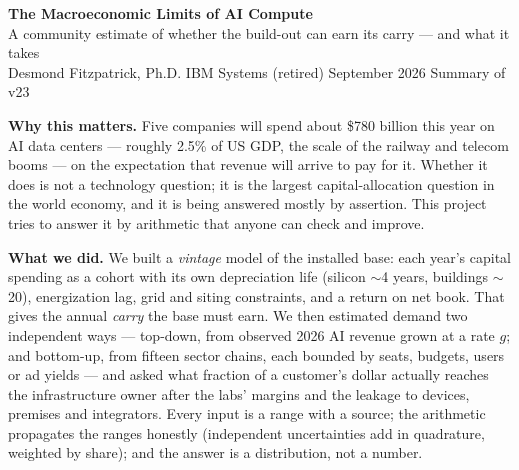 \documentclass[11pt,letterpaper]{article}
\begin{document}
\begin{center}{\Large\textbf{The Macroeconomic Limits of AI Compute}}\\[2pt]
{\normalsize A community estimate of whether the build-out can earn its carry --- and what it takes}\\[2pt]
{\small Desmond Fitzpatrick, Ph.D. \quad IBM Systems (retired) \quad September 2026 \quad Summary of v23}\end{center}
\vspace{4pt}
\noindent\textbf{Why this matters.} Five companies will spend about \$780 billion this year on AI data centers --- roughly 2.5\% of US GDP, the scale of the railway and telecom booms --- on the expectation that revenue will arrive to pay for it. Whether it does is not a technology question; it is the largest capital-allocation question in the world economy, and it is being answered mostly by assertion. This project tries to answer it by arithmetic that anyone can check and improve.

\noindent\textbf{What we did.} We built a \emph{vintage} model of the installed base: each year's capital spending as a cohort with its own depreciation life (silicon $\sim$4 years, buildings $\sim$20), energization lag, grid and siting constraints, and a return on net book. That gives the annual \emph{carry} the base must earn. We then estimated demand two independent ways --- top-down, from observed 2026 AI revenue grown at a rate $g$; and bottom-up, from fifteen sector chains, each bounded by seats, budgets, users or ad yields --- and asked what fraction of a customer's dollar actually reaches the infrastructure owner after the labs' margins and the leakage to devices, premises and integrators. Every input is a range with a source; the arithmetic propagates the ranges honestly (independent uncertainties add in quadrature, weighted by share); and the answer is a distribution, not a number.
\end{document}
